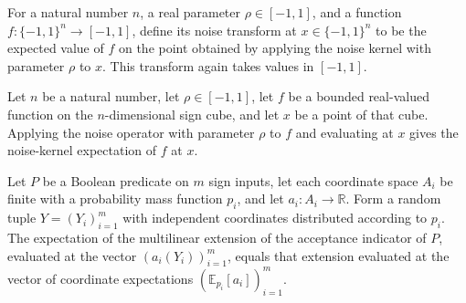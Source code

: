 \begin{definition}
\label{FABL.BoundedCubeFunction.noise}
\leanok
{}
For a natural number $n$, a real parameter $\rho\in[-1,1]$, and a function
$f:\{-1,1\}^n\to[-1,1]$, define its noise transform at $x\in\{-1,1\}^n$ to be the
expected value of $f$ on the point obtained by applying the noise kernel with parameter
$\rho$ to $x$. This transform again takes values in $[-1,1]$.
\end{definition}

\begin{theorem}
\label{FABL.BoundedCubeFunction.noise_apply}
\leanok
{}
Let $n$ be a natural number, let $\rho\in[-1,1]$, let $f$ be a bounded real-valued
function on the $n$-dimensional sign cube, and let $x$ be a point of that cube. Applying
the noise operator with parameter $\rho$ to $f$ and evaluating at $x$ gives the
noise-kernel expectation of $f$ at $x$.
\end{theorem}

\begin{theorem}
\label{FABL.pmfExpectation_multilinearExtension_independentProduct}
\leanok
{}
Let $P$ be a Boolean predicate on $m$ sign inputs, let each coordinate space $A_i$ be
finite with a probability mass function $p_i$, and let $a_i:A_i\to\mathbb{R}$. Form a
random tuple $Y=(Y_i)_{i=1}^m$ with independent coordinates distributed according to
$p_i$. The expectation of the multilinear extension of the acceptance indicator of $P$,
evaluated at the vector $(a_i(Y_i))_{i=1}^m$, equals that extension evaluated at the
vector of coordinate expectations $(\mathbb{E}_{p_i}[a_i])_{i=1}^m$.
\end{theorem}

